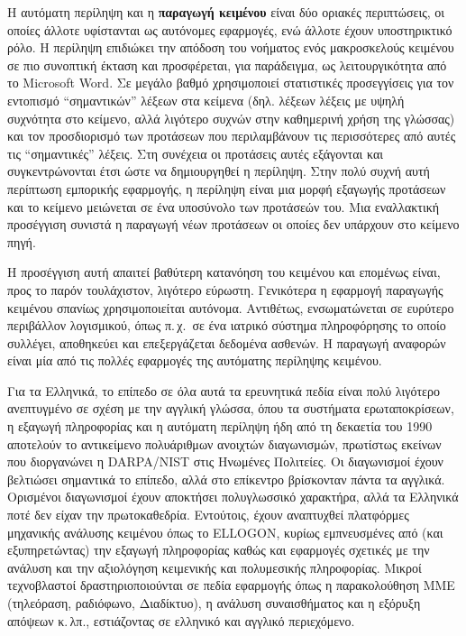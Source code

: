 \documentclass[]{../../metanetpaper}
\begin{document}
\begin{multicols}{2}
Η αυτόματη περίληψη και η \textbf{παραγωγή κειμένου} είναι δύο οριακές περιπτώσεις, οι οποίες άλλοτε υφίστανται ως αυτόνομες εφαρμογές, ενώ άλλοτε έχουν υποστηρικτικό ρόλο. Η περίληψη επιδιώκει την απόδοση του νοήματος ενός μακροσκελούς κειμένου σε πιο συνοπτική έκταση και προσφέρεται, για παράδειγμα, ως λειτουργικότητα από το Microsoft Word. Σε μεγάλο βαθμό χρησιμοποιεί στατιστικές προσεγγίσεις για τον εντοπισμό ``σημαντικών'' λέξεων στα κείμενα (δηλ. λέξεων λέξεις με υψηλή συχνότητα στο κείμενο, αλλά λιγότερο συχνών στην καθημερινή χρήση της γλώσσας) και τον προσδιορισμό των προτάσεων που περιλαμβάνουν τις περισσότερες από αυτές τις ``σημαντικές'' λέξεις. Στη συνέχεια οι προτάσεις αυτές εξάγονται και συγκεντρώνονται έτσι ώστε να δημιουργηθεί η περίληψη. Στην πολύ συχνή αυτή περίπτωση εμπορικής εφαρμογής, η περίληψη είναι μια μορφή εξαγωγής προτάσεων και το κείμενο μειώνεται σε ένα υποσύνολο των προτάσεών του. Μια εναλλακτική προσέγγιση συνιστά η παραγωγή νέων προτάσεων οι οποίες δεν υπάρχουν στο κείμενο πηγή.


Η προσέγγιση αυτή απαιτεί βαθύτερη κατανόηση του κειμένου και επομένως είναι, προς το παρόν τουλάχιστον, λιγότερο εύρωστη. Γενικότερα η εφαρμογή παραγωγής κειμένου σπανίως χρησιμοποιείται αυτόνομα. Αντιθέτως, ενσωματώνεται σε ευρύτερο περιβάλλον λογισμικού, όπως π.\,χ.~σε ένα ιατρικό σύστημα πληροφόρησης το οποίο συλλέγει, αποθηκεύει και επεξεργάζεται δεδομένα ασθενών. Η παραγωγή αναφορών είναι μία από τις πολλές εφαρμογές της αυτόματης περίληψης κειμένου. 

Για τα Ελληνικά, το επίπεδο σε όλα αυτά τα ερευνητικά πεδία είναι πολύ λιγότερο ανεπτυγμένο σε σχέση με την αγγλική γλώσσα, όπου τα συστήματα ερωταποκρίσεων, η εξαγωγή πληροφορίας και η αυτόματη περίληψη ήδη από τη δεκαετία του 1990 αποτελούν το αντικείμενο πολυάριθμων ανοιχτών διαγωνισμών, πρωτίστως εκείνων που διοργανώνει η DARPA/NIST στις Ηνωμένες Πολιτείες. Οι διαγωνισμοί έχουν βελτιώσει σημαντικά το επίπεδο, αλλά στο επίκεντρο βρίσκονταν πάντα τα αγγλικά. Ορισμένοι διαγωνισμοί έχουν αποκτήσει πολυγλωσσικό χαρακτήρα, αλλά τα Ελληνικά ποτέ δεν είχαν την πρωτοκαθεδρία. Εντούτοις, έχουν αναπτυχθεί πλατφόρμες μηχανικής ανάλυσης κειμένου όπως το ELLOGON, κυρίως εμπνευσμένες από (και εξυπηρετώντας) την εξαγωγή πληροφορίας καθώς και εφαρμογές σχετικές με την ανάλυση και την  αξιολόγηση κειμενικής και πολυμεσικής πληροφορίας. Μικροί τεχνοβλαστοί δραστηριοποιούνται σε πεδία εφαρμογής όπως η παρακολούθηση ΜΜΕ (τηλεόραση, ραδιόφωνο, Διαδίκτυο), η ανάλυση συναισθήματος και η εξόρυξη απόψεων κ.\,λπ., εστιάζοντας σε ελληνικό και αγγλικό περιεχόμενο. 


\end{multicols}
\end{document}
